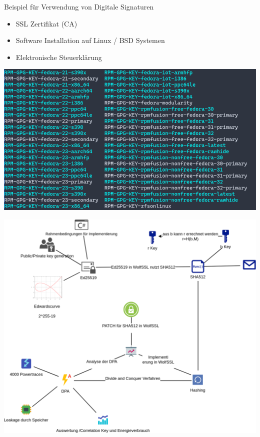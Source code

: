 \documentclass[
  11 pt,
  ignorenonframetext,
  aspectratio=43,
]{beamer}
\providecommand{\tightlist}{%
  \setlength{\itemsep}{0pt}\setlength{\parskip}{0pt}}
\begin{document}
\begin{frame}{Beispiel für Verwendung von Digitale Signaturen}
\protect\hypertarget{beispiel-fuxfcr-verwendung-von-digitale-signaturen}{}
\begin{itemize}
\tightlist
\item
  SSL Zertifikat (CA)
\item
  Software Installation auf Linux / BSD Systemen
\item
  Elektronische Steuerklärung
\end{itemize}

\includegraphics[width=\textwidth,height=0.6\textheight]{Abbildungen/GPG.png}
\end{frame}

\begin{frame}{}
\protect\hypertarget{section}{}
\includegraphics{Abbildungen/ITSEC(1)_res.png}
\end{frame}
\end{document}
